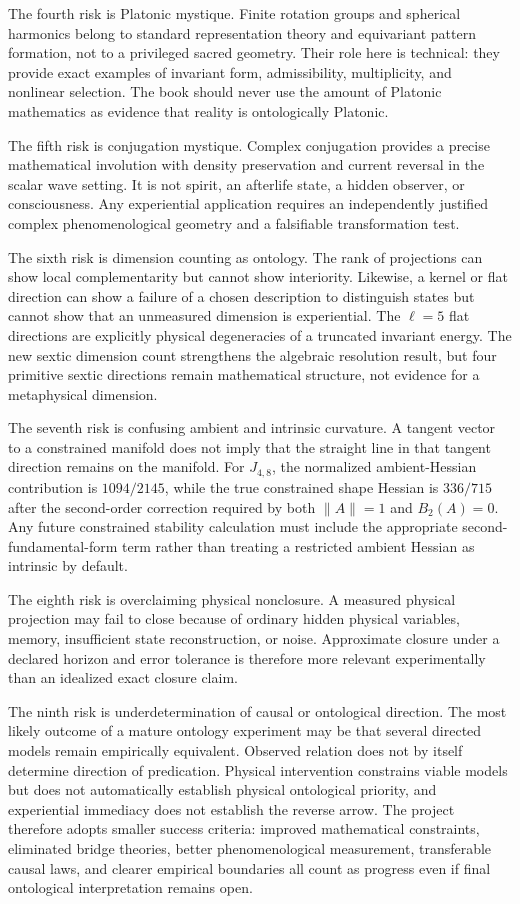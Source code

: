 The fourth risk is Platonic mystique. Finite rotation groups and spherical harmonics belong to standard representation theory and equivariant pattern formation, not to a privileged sacred geometry. Their role here is technical: they provide exact examples of invariant form, admissibility, multiplicity, and nonlinear selection. The book should never use the amount of Platonic mathematics as evidence that reality is ontologically Platonic.

The fifth risk is conjugation mystique. Complex conjugation provides a precise mathematical involution with density preservation and current reversal in the scalar wave setting. It is not spirit, an afterlife state, a hidden observer, or consciousness. Any experiential application requires an independently justified complex phenomenological geometry and a falsifiable transformation test.

The sixth risk is dimension counting as ontology. The rank of projections can show local complementarity but cannot show interiority. Likewise, a kernel or flat direction can show a failure of a chosen description to distinguish states but cannot show that an unmeasured dimension is experiential. The $\ell=5$ flat directions are explicitly physical degeneracies of a truncated invariant energy. The new sextic dimension count strengthens the algebraic resolution result, but four primitive sextic directions remain mathematical structure, not evidence for a metaphysical dimension.

The seventh risk is confusing ambient and intrinsic curvature. A tangent vector to a constrained manifold does not imply that the straight line in that tangent direction remains on the manifold. For $J_{4,8}$, the normalized ambient-Hessian contribution is $1094/2145$, while the true constrained shape Hessian is $336/715$ after the second-order correction required by both $\|A\|=1$ and $B_2(A)=0$. Any future constrained stability calculation must include the appropriate second-fundamental-form term rather than treating a restricted ambient Hessian as intrinsic by default.

The eighth risk is overclaiming physical nonclosure. A measured physical projection may fail to close because of ordinary hidden physical variables, memory, insufficient state reconstruction, or noise. Approximate closure under a declared horizon and error tolerance is therefore more relevant experimentally than an idealized exact closure claim.

The ninth risk is underdetermination of causal or ontological direction. The most likely outcome of a mature ontology experiment may be that several directed models remain empirically equivalent. Observed relation does not by itself determine direction of predication. Physical intervention constrains viable models but does not automatically establish physical ontological priority, and experiential immediacy does not establish the reverse arrow. The project therefore adopts smaller success criteria: improved mathematical constraints, eliminated bridge theories, better phenomenological measurement, transferable causal laws, and clearer empirical boundaries all count as progress even if final ontological interpretation remains open.

